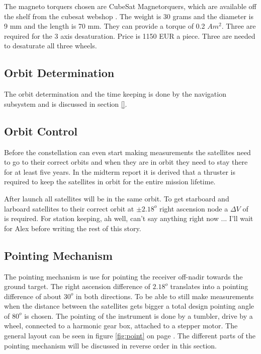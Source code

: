 The magneto torquers chosen are CubeSat Magnetorquers, which are available off the shelf from the cubesat webshop \cite{cubesatshop}. The weight is 30 grams and the diameter is 9 mm and the length is 70 mm. They can provide a torque of 0.2 $Am^2$. Three are required for the 3 axis desaturation. Price is 1150 EUR a piece. Three are needed to desaturate all three wheels.


\subsection{Orbit Determination}
\label{subsec:ODS}
The orbit determination and the time keeping is done by the navigation subsystem and is discussed in section \ref{}. %


\subsection{Orbit Control}
\label{subsec:OCS}
Before the constellation can even start making measurements the satellites need to go to their correct orbits and when they are in orbit they need to stay there for at least five years. In the midterm report it is derived that a thruster is required to keep the satellites in orbit for the entire mission lifetime. 

After launch all satellites will be in the same orbit. To get starboard and larboard satellites to their correct orbit at $\pm 2.18^o$ right ascension node a $\Delta V$ of 
\begin{equation}
\end{equation}
is required. For station keeping, ah well, can't say anything right now ...
I'll wait for Alex before writing the rest of this story. 


\subsection{Pointing Mechanism}
\label{subsec:point}
The pointing mechanism is use for pointing the receiver off-nadir towards the ground target. The right ascension difference of $2.18^o$ translates into a pointing difference of about $30^o$ in both directions. To be able to still make measurements when the distance between the satellites gets bigger a total design pointing angle of $80^o$ is chosen. The pointing of the instrument is done by a tumbler, drive by a wheel, connected to a harmonic gear box, attached to a stepper motor. The general layout can be seen in figure \ref{fig:point} on page \pageref{fig:point}. The different parts of the pointing mechanism will be discussed in reverse order in this section.

